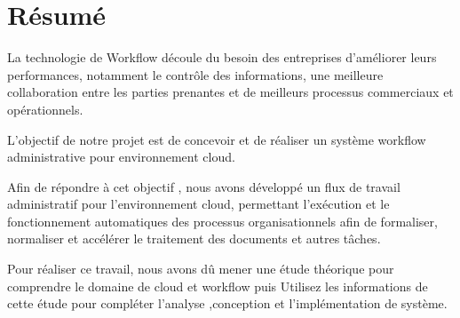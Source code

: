 \chapter*{Résumé}



La technologie de Workflow découle du besoin des entreprises d’améliorer leurs performances, notamment le contrôle des informations, une meilleure collaboration entre les parties prenantes et de meilleurs processus commerciaux et opérationnels.

L'objectif de notre projet est de concevoir et de réaliser un système workflow administrative  pour environnement cloud.
 

Afin de répondre à cet objectif , nous avons développé un flux de travail administratif pour l'environnement cloud, permettant l'exécution et le fonctionnement automatiques des processus organisationnels afin de formaliser, normaliser et accélérer le traitement des documents et autres tâches.

Pour réaliser ce travail, nous avons dû mener une étude théorique pour comprendre le domaine de cloud  et workflow  puis Utilisez les informations de cette étude pour compléter l'analyse ,conception et l'implémentation de système.






